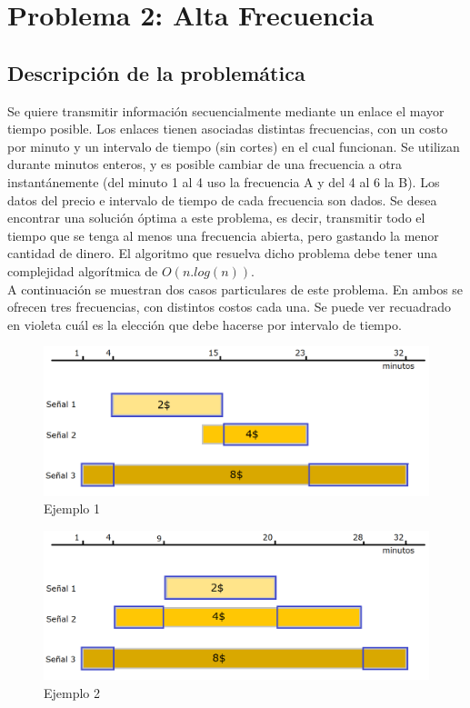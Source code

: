 \section{Problema 2: Alta Frecuencia}
\subsection{Descripci\'on de la problem\'atica}

Se quiere transmitir informaci\'on secuencialmente mediante un enlace el mayor tiempo posible. Los enlaces tienen asociadas distintas frecuencias, con un costo por minuto y un intervalo de tiempo (sin cortes) en el cual funcionan. Se utilizan durante minutos enteros, y es posible cambiar de una frecuencia a otra instant\'anemente (del minuto 1 al 4 uso la frecuencia A y del 4 al 6 la B). Los datos del precio e intervalo de tiempo de cada frecuencia son dados. Se desea encontrar una soluci\'on \'optima a este problema, es decir, transmitir todo el tiempo que se tenga al menos una frecuencia abierta, pero gastando la menor cantidad de dinero. El algoritmo que resuelva dicho problema debe tener una complejidad algorítmica de $O(n.log(n))$.\\

A continuaci\'on se muestran dos casos particulares de este problema. En ambos se ofrecen tres frecuencias, con distintos costos cada una. Se puede ver recuadrado en violeta cu\'al es la elecci\'on que debe hacerse por intervalo de tiempo.


 \begin{figure}[h!]
   \begin{center}
 	\includegraphics[scale=0.45]{imagenes/ej2/ejemplo1.png}
 	\caption{Ejemplo 1}
   \end{center}
 \end{figure}

 \begin{figure}[h!]
   \begin{center}
 	\includegraphics[scale=0.45]{imagenes/ej2/ejemplo2.png}
 	\caption{Ejemplo 2}
   \end{center}
 \end{figure}


